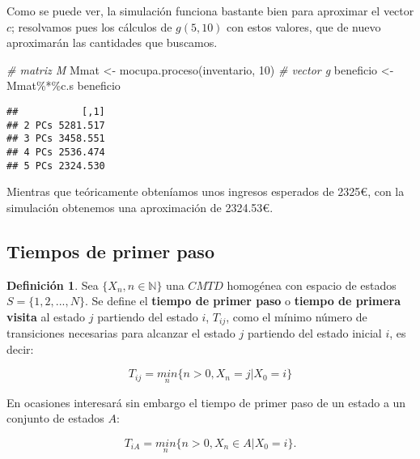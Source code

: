 \documentclass[
]{book}
\newenvironment{Shaded}{\begin{snugshade}}{\end{snugshade}}
\newcommand{\CommentTok}[1]{\textcolor[rgb]{0.56,0.35,0.01}{\textit{#1}}}
\newcommand{\DecValTok}[1]{\textcolor[rgb]{0.00,0.00,0.81}{#1}}
\newcommand{\FunctionTok}[1]{\textcolor[rgb]{0.00,0.00,0.00}{#1}}
\newcommand{\NormalTok}[1]{#1}
\newcommand{\OtherTok}[1]{\textcolor[rgb]{0.56,0.35,0.01}{#1}}
\newcommand{\SpecialCharTok}[1]{\textcolor[rgb]{0.00,0.00,0.00}{#1}}
\newenvironment{yellowbox}{
  \definecolor{shadecolor}{rgb}{210, 180, 140}  
  \color{black}
  \begin{shaded}}
 {\end{shaded}}
\theoremstyle{definition}
\newtheorem{definition}{Definición}[chapter]
\theoremstyle{definition}
\theoremstyle{definition}
\theoremstyle{definition}
\theoremstyle{remark}
\begin{document}
Como se puede ver, la simulación funciona bastante bien para aproximar el vector \(c\); resolvamos pues los cálculos de \(g(5,10)\) con estos valores, que de nuevo aproximarán las cantidades que buscamos.

\begin{Shaded}
\begin{Highlighting}[]
\CommentTok{\# matriz M}
\NormalTok{Mmat }\OtherTok{\textless{}{-}} \FunctionTok{mocupa.proceso}\NormalTok{(inventario, }\DecValTok{10}\NormalTok{)}
\CommentTok{\# vector g}
\NormalTok{beneficio }\OtherTok{\textless{}{-}}\NormalTok{ Mmat}\SpecialCharTok{\%*\%}\NormalTok{c.s}
\NormalTok{beneficio}
\end{Highlighting}
\end{Shaded}

\begin{verbatim}
##           [,1]
## 2 PCs 5281.517
## 3 PCs 3458.551
## 4 PCs 2536.474
## 5 PCs 2324.530
\end{verbatim}

Mientras que teóricamente obteníamos unos ingresos esperados de 2325€, con la simulación obtenemos una aproximación de 2324.53€.

\hypertarget{tiempos-de-primer-paso}{%
\subsection{Tiempos de primer paso}\label{tiempos-de-primer-paso}}

\begin{yellowbox}

\begin{definition}
Sea \(\{X_n, n \in \mathbb{N}\}\) una \(CMTD\) homogénea con espacio de estados \(S = \{1, 2,...,N\}\). Se define el \textbf{tiempo de primer paso} o \textbf{tiempo de primera visita} al estado \(j\) partiendo del estado \(i\), \(T_{ij}\), como el mínimo número de transiciones necesarias para alcanzar el estado \(j\) partiendo del estado inicial \(i\), es decir:

\[T_{ij} = \underset{n}{min}\{n > 0, X_n = j | X_0 = i\}\]

En ocasiones interesará sin embargo el tiempo de primer paso de un estado a un conjunto de estados \(A\):

\[T_{iA} = \underset{n}{min}\{n > 0, X_n \in A | X_0 = i\}.\]
\end{definition}

\end{yellowbox}
\end{document}
